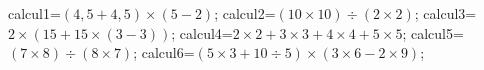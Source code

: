 \documentclass[exercice]{thedocument}%
\begin{document}
%
    \>calcul1=$(4,5+4,5)\times(5-2)$;%
    \>calcul2=$(10\times10)\div(2\times2)$;%
    \>calcul3=$2\times(15+15\times(3-3))$;%
    \>calcul4=$2\times2+3\times3+4\times4+5\times5$;%
    \>calcul5=$(7\times8)\div(8\times7)$;%
    \>calcul6=$(5\times3+10\div5)\times(3\times6-2\times9)$;%
\end{document}
